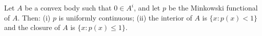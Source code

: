 Let $A$ be a convex body such that $0 \in A^i$, and let $p$ be the Minkowski functional of $A$. Then:
(i) $p$ is uniformly continuous;
(ii) the interior of $A$ is $\{x : p(x) < 1\}$ and the closure of $A$ is $\{x : p(x) \leq 1\}$.
